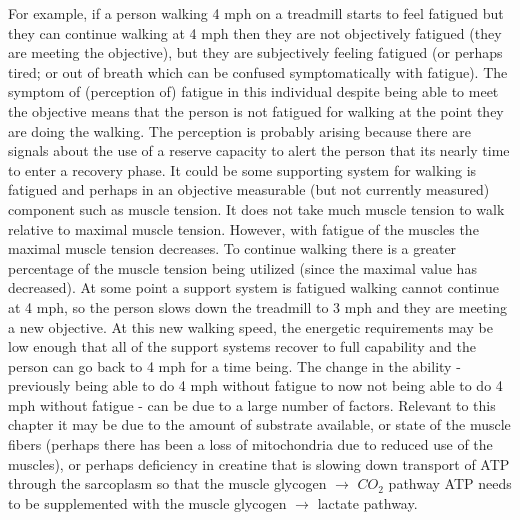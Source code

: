 For example, if a person walking 4 mph on a treadmill starts to feel fatigued but they can continue walking at 4 mph then they are not objectively fatigued (they are meeting the objective), but they are subjectively feeling fatigued (or perhaps tired; or out of breath which can be confused symptomatically with fatigue). The symptom of (perception of) fatigue in this individual despite being able to meet the objective means that the person is not fatigued for walking at the point they are doing the walking. The perception is probably arising because there are signals about the use of a reserve capacity to alert the person that its nearly time to enter a recovery phase. It could be some supporting system for walking is fatigued and perhaps in an objective measurable (but not currently measured) component such as muscle tension. It does not take much muscle tension to walk relative to maximal muscle tension. However, with fatigue of the muscles the maximal muscle tension decreases. To continue walking there is a greater percentage of the muscle tension being utilized (since the maximal value has decreased). At some point a support system is fatigued walking cannot continue at 4 mph, so the person slows down the treadmill to 3 mph and they are meeting a new objective. At this new walking speed, the energetic requirements may be low enough that all of the support systems recover to full capability and the person can go back to 4 mph for a time being. The change in the ability - previously being able to do 4 mph without fatigue to now not being able to do 4 mph without fatigue - can be due to a large number of factors. Relevant to this chapter it may be due to the amount of substrate available, or state of the muscle fibers (perhaps there has been a loss of mitochondria due to reduced use of the muscles), or perhaps deficiency in creatine that is slowing down transport of ATP through the sarcoplasm so that the muscle glycogen $\rightarrow$ $CO_2$ pathway ATP needs to be supplemented with the muscle glycogen $\rightarrow$ lactate pathway.

